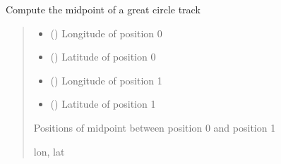 \documentclass[letterpaper,10pt,english]{sphinxmanual}
\begin{document}
\begin{fulllineitems}
\label{\detokenize{users_guide:GeoSpatialTools.distance_metrics.midpoint}}
\pysigstartsignatures
\pysiglinewithargsret
{}
{\sphinxparamcomma {}\sphinxparamcomma {}\sphinxparamcomma {}}
{}
\pysigstopsignatures
\sphinxAtStartPar
Compute the midpoint of a great circle track
\begin{quote}\begin{description}
\begin{itemize}
\item {} 
\sphinxAtStartPar
{} () \textendash{} Longitude of position 0

\item {} 
\sphinxAtStartPar
{} () \textendash{} Latitude of position 0

\item {} 
\sphinxAtStartPar
{} () \textendash{} Longitude of position 1

\item {} 
\sphinxAtStartPar
{} () \textendash{} Latitude of position 1

\end{itemize}

\sphinxAtStartPar
Positions of midpoint between position 0 and position 1

\sphinxAtStartPar
lon, lat

\end{description}\end{quote}

\end{fulllineitems}
\end{document}
